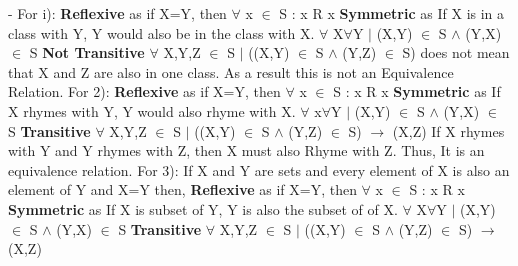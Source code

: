 \documentclass[addpoints]{exam}
\begin{document}
\begin{questions}
\begin{parts}
  \begin{solution}
    -  \newline
   For i): \newline
   \textbf{Reflexive} as if X=Y, then  $\forall $ x $\in$ S : x R x  \newline
   \textbf{Symmetric} as If X is in a class with Y, Y would also be in the class with X.
   \newline    $\forall $ X$\forall $Y $|$ (X,Y) $\in$ S $\wedge$ (Y,X) $\in$ S \newline
   \textbf{Not Transitive} \newline 
   $\forall$ X,Y,Z $\in$ S $|$ ((X,Y) $\in$ S  $\wedge$ (Y,Z) $\in$ S)  does not mean that X and Z are also in one class.
   \newline 
   As a result this is not an Equivalence Relation.
   \newline
   \newline For 2): \newline
   \textbf{Reflexive} as if X=Y, then  $\forall $ x $\in$ S : x R x  \newline
   \textbf{Symmetric} as If X rhymes with Y, Y would also rhyme with X.
   \newline    $\forall $ x$\forall $Y $|$ (X,Y) $\in$ S $\wedge$ (Y,X) $\in$ S \newline
   \textbf{Transitive} \newline 
   $\forall$ X,Y,Z $\in$ S $|$ ((X,Y) $\in$ S  $\wedge$ (Y,Z) $\in$ S) $\rightarrow$ (X,Z) \newline
   If X rhymes with Y and Y rhymes with Z, then X must also Rhyme with Z.
   \newline Thus, It is an equivalence relation.
    \newline
   \newline For 3):\newline
   If X and Y are sets and every element of X is also an element of Y and X=Y then,
   \newline 
   \textbf{Reflexive} as if X=Y, then  $\forall $ x $\in$ S : x R x  \newline
   \textbf{Symmetric} as If X is subset of Y, Y is also the subset of of X.
   \newline     $\forall $ X$\forall $Y $|$ (X,Y) $\in$ S $\wedge$ (Y,X) $\in$ S \newline
   \textbf{Transitive} \newline 
   $\forall$ X,Y,Z $\in$ S $|$ ((X,Y) $\in$ S  $\wedge$ (Y,Z) $\in$ S) $\rightarrow$ (X,Z)

\end{solution}
\end{parts}
\end{questions}
\end{document}
